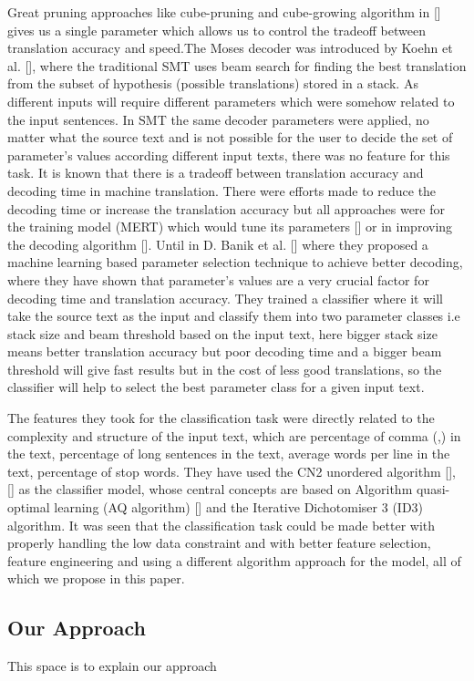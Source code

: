 \documentclass{article}
\begin{document}
Great pruning approaches like cube-pruning and cube-growing algorithm in [] gives us a single parameter which allows us to control the tradeoff between translation accuracy and speed.The Moses decoder was introduced by Koehn et al. [], where the traditional SMT uses beam search for finding the best translation from the subset of hypothesis (possible translations) stored in a stack. As different inputs will require different parameters which were somehow related to the input sentences. In SMT the same decoder parameters were applied, no matter what the source text and is not possible for the  user to decide the set of parameter's values according different input texts, there was no feature for this task. It is known that there is a tradeoff between translation accuracy and decoding time in machine translation. There were efforts made to reduce the decoding time or increase the translation accuracy but all approaches were for the training model (MERT) which would tune its parameters [] or in improving the decoding algorithm []. Until in D. Banik et al. [] where they proposed a machine learning based parameter selection technique to achieve better decoding, where they have shown that parameter's values are a very crucial factor for decoding time and translation accuracy. They trained a classifier where it will take the source text as the input and classify them into two parameter classes i.e stack size and beam threshold based on the input text, here bigger stack size means better translation accuracy but poor decoding time and a bigger beam threshold will give fast results but in the cost of less good translations, so the classifier will help to select the best parameter class for a given input text.

The features they took for the classification task were directly related to the complexity and structure of the input text, which are percentage of comma (,) in the text, percentage of long sentences in the text, average words per line in the text, percentage of stop words. They have used the CN2 unordered algorithm [], [] as the classifier model, whose central concepts are based on Algorithm quasi-optimal learning (AQ algorithm) [] and the Iterative Dichotomiser 3 (ID3) algorithm. It was seen that the classification task could be made better with properly handling the low data constraint and with better feature selection, feature engineering and using a different algorithm approach for the model, all of which we propose in this paper.


\subsection{Our Approach}
This space is to explain our approach
\end{document}
